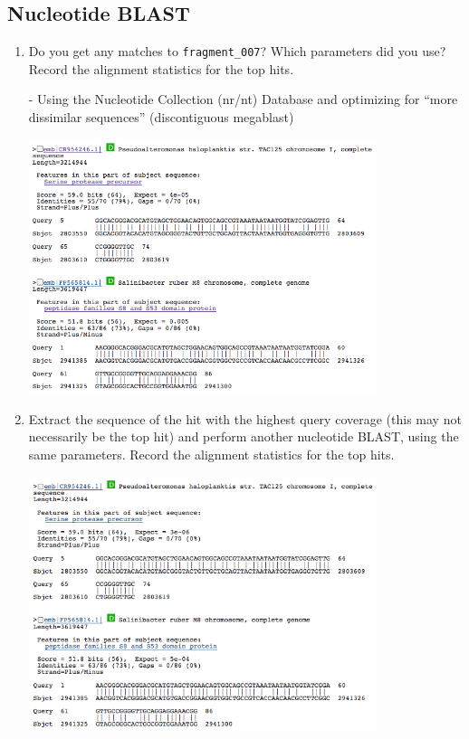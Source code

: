 \documentclass[a4paper,11pt]{article}
\begin{document}
\subsection{Nucleotide BLAST}

\begin{enumerate}
\item Do you get any matches to \texttt{fragment\_007}? Which parameters did you use? Record the alignment statistics for the top hits.

- Using the Nucleotide Collection (nr/nt) Database and optimizing for ``more dissimilar sequences''
(discontiguous megablast)

\vspace{0.5cm}
\begin{center}
\includegraphics[width=0.8\textwidth]{blastn1.png}
\end{center}
\vspace{0.5cm}

\item Extract the sequence of the hit with the highest query coverage (this may not necessarily be the top hit) and perform another nucleotide BLAST, using the same parameters. Record the alignment statistics for the top hits.

\vspace{0.5cm}
\begin{center}
\includegraphics[width=0.8\textwidth]{blastn2.png}
\end{center}
\vspace{0.5cm}


\end{enumerate}
\end{document}
